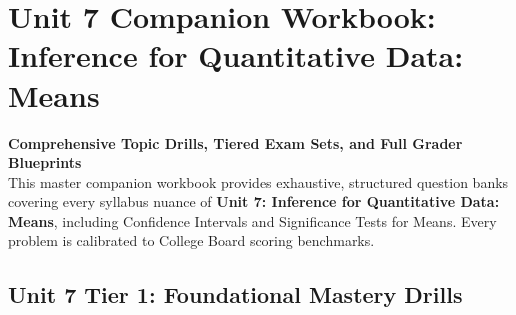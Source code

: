\chapter{Unit 7 Companion Workbook: Inference for Quantitative Data: Means}
\label{chap:companion_unit_7}
{\large\bfseries\color{MidnightBlue} Comprehensive Topic Drills, Tiered Exam Sets, and Full Grader Blueprints}\\[8pt]
This master companion workbook provides exhaustive, structured question banks covering every syllabus nuance of \textbf{Unit 7: Inference for Quantitative Data: Means}, including Confidence Intervals and Significance Tests for Means. Every problem is calibrated to College Board scoring benchmarks.\\[12pt]
\section{Unit 7 Tier 1: Foundational Mastery Drills}
